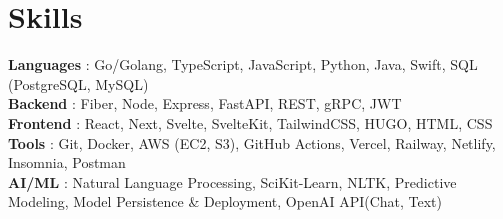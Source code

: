 \documentclass[a4,10pt]{article}
\newenvironment{zitemize}{
\begin{itemize}\itemsep0pt \parskip0pt \parsep1pt}
{\end{itemize}\vspace{-0.5cm}}
\newcommand{\hskills}[1]{
\textbf{\bfseries #1} }
\begin{document}
\section{Skills}
\hskills{Languages}: {Go/Golang, TypeScript, JavaScript, Python,  Java, Swift, SQL (PostgreSQL, MySQL)}  \\
\hskills{Backend}: {Fiber, Node, Express, FastAPI, REST, gRPC, JWT }  \\
\hskills{Frontend}: {React, Next, Svelte, SvelteKit, TailwindCSS, HUGO, HTML, CSS} \\
\hskills{Tools}: {Git, Docker, AWS (EC2, S3), GitHub Actions, Vercel, Railway, Netlify, Insomnia, Postman} \\
\hskills{AI/ML}: {Natural Language Processing, SciKit-Learn, NLTK, Predictive Modeling, Model Persistence \& Deployment, OpenAI API(Chat, Text)}\\
\vspace{-0.2cm}










\end{document}
